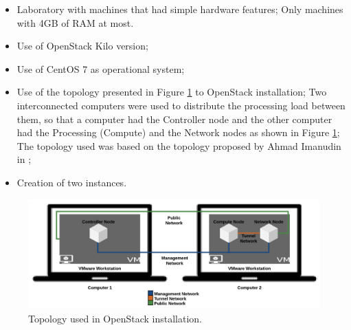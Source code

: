 \documentclass[conference]{IEEEtran}
\begin{document}
	
	\begin{itemize}
	 \item Laboratory with machines that had simple hardware features;
	    \subitem Only machines with 4GB of RAM at most.
	 \item Use of OpenStack Kilo version;
	 \item Use of CentOS 7 \cite{centos} as operational system;
	 \item Use of the topology presented in Figure \ref{fig:topologia} to OpenStack installation;
	    \subitem Two interconnected computers were used to distribute the processing load between them,
		     so that a computer had the Controller node and the other computer had the Processing (Compute) and the Network
		     nodes as shown in Figure \ref{fig:topologia};
	    \subitem The topology used was based on the topology proposed by Ahmad Imanudin in \cite{imanudin};
	  \item Creation of two instances.
	\end{itemize}
	
	\begin{figure}[ht]
	\centering
	\includegraphics[width=.5\textwidth]{figuras/topologia.png}
	\caption{Topology used in OpenStack installation.}
	\label{fig:topologia}
	\end{figure}
	
\end{document}
